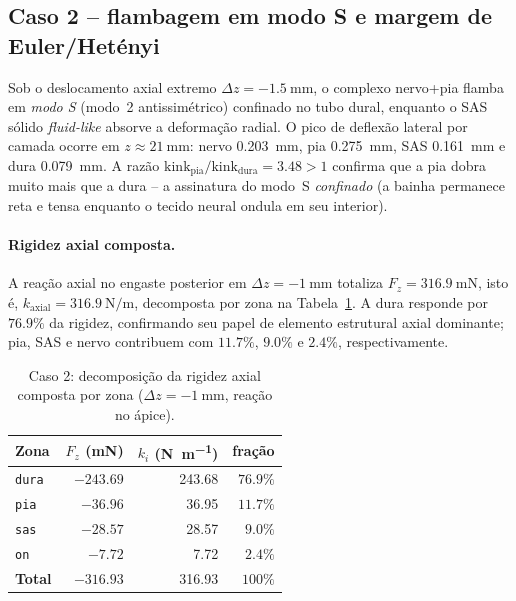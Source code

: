 \subsection*{Caso 2 -- flambagem em modo S e margem de Euler/Hetényi}
\label{sec:res-caso2}

Sob o deslocamento axial extremo $\Delta z = -\SI{1.5}{\milli\meter}$, o complexo nervo+pia flamba em \emph{modo S} (modo~2 antissimétrico) confinado no tubo dural, enquanto o SAS sólido \emph{fluid-like} absorve a deformação radial. O pico de deflexão lateral por camada ocorre em $z \approx \SI{21}{\milli\meter}$: nervo \SI{0.203}{\milli\meter}, pia \SI{0.275}{\milli\meter}, SAS \SI{0.161}{\milli\meter} e dura \SI{0.079}{\milli\meter}. A razão $\mathrm{kink}_{\mathrm{pia}}/\mathrm{kink}_{\mathrm{dura}} = 3.48 > 1$ confirma que a pia dobra muito mais que a dura -- a assinatura do modo~S \emph{confinado} (a bainha permanece reta e tensa enquanto o tecido neural ondula em seu interior).

\paragraph{Rigidez axial composta.} A reação axial no engaste posterior em $\Delta z = -\SI{1}{\milli\meter}$ totaliza $F_z = \SI{316.9}{\milli\newton}$, isto é, $k_{\mathrm{axial}} = \SI{316.9}{\newton\per\meter}$, decomposta por zona na Tabela~\ref{tab:res-kaxial}. A dura responde por $76.9\%$ da rigidez, confirmando seu papel de elemento estrutural axial dominante; pia, SAS e nervo contribuem com $11.7\%$, $9.0\%$ e $2.4\%$, respectivamente.

\begin{table}[h!]
\centering
\small
\caption{Caso 2: decomposição da rigidez axial composta por zona
($\Delta z = -\SI{1}{\milli\meter}$, reação no ápice).}
\label{tab:res-kaxial}
\begin{tabular}{l r r r}
\toprule
\textbf{Zona} & $F_z$ (\si{\milli\newton}) & $k_i$ (\si{\newton\per\meter}) & fração \\
\midrule
\texttt{dura} & $-243.69$ & 243.68 & $76.9\%$ \\
\texttt{pia}  & $-36.96$  & 36.95  & $11.7\%$ \\
\texttt{sas}  & $-28.57$  & 28.57  & $9.0\%$  \\
\texttt{on}   & $-7.72$   & 7.72   & $2.4\%$  \\
\midrule
\textbf{Total} & $-316.93$ & 316.93 & $100\%$ \\
\bottomrule
\end{tabular}
\end{table}

